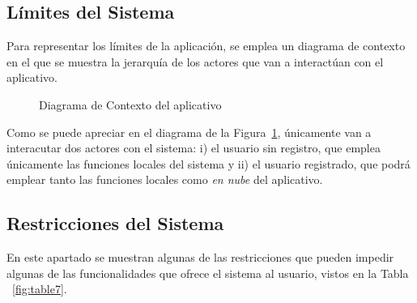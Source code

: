   \subsection{Límites del Sistema}
  Para representar los límites de la aplicación, se emplea un diagrama de contexto en el que se muestra la jerarquía de los actores 
  que van a interactúan con el aplicativo.

\begin{figure}[H]
  \centering
{}
  \caption{Diagrama de Contexto del aplicativo}
   \label{fig:dom2}
\end{figure}

Como se puede apreciar en el diagrama de la Figura~\ref{fig:dom2}, únicamente van a interacutar dos actores con el sistema: i) el usuario sin registro,
que emplea únicamente las funciones locales del sistema y ii) el usuario registrado, que podrá emplear tanto las funciones locales como
\textit{en nube} del aplicativo.

\subsection{Restricciones del Sistema}

En este apartado se muestran algunas de las restricciones que pueden impedir algunas de las funcionalidades que ofrece el sistema
al usuario, vistos en la Tabla ~\ref{fig:table7}.

